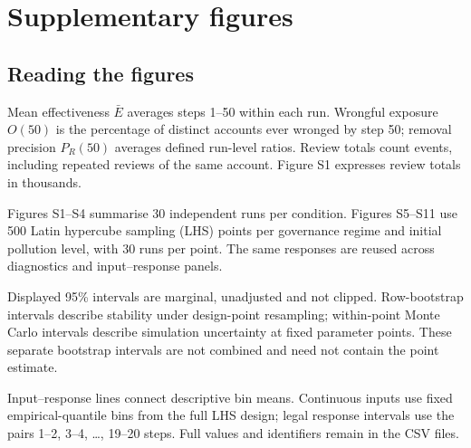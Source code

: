 \documentclass[10pt]{article}
\newif\ifABMLandscapePage
\begin{document}
\clearpage
{}
\ABMLandscapePagetrue\pagestyle{empty}
\begin{landscape}

\end{landscape}
\ABMLandscapePagefalse\pagestyle{plain}
\restoregeometry
\clearpage

\section{Supplementary figures}\label{sec:supp-figures}
\subsection*{Reading the figures}

Mean effectiveness $\bar E$ averages steps 1--50 within each run. Wrongful exposure $O(50)$ is the percentage of distinct accounts ever wronged by step 50; removal precision $P_R(50)$ averages defined run-level ratios. Review totals count events, including repeated reviews of the same account. Figure S1 expresses review totals in thousands.

Figures S1--S4 summarise 30 independent runs per condition. Figures S5--S11 use 500 Latin hypercube sampling (LHS) points per governance regime and initial pollution level, with 30 runs per point. The same responses are reused across diagnostics and input--response panels.

Displayed 95\% intervals are marginal, unadjusted and not clipped. Row-bootstrap intervals describe stability under design-point resampling; within-point Monte Carlo intervals describe simulation uncertainty at fixed parameter points. These separate bootstrap intervals are not combined and need not contain the point estimate.

Input--response lines connect descriptive bin means. Continuous inputs use fixed empirical-quantile bins from the full LHS design; legal response intervals use the pairs 1--2, 3--4, \ldots, 19--20 steps. Full values and identifiers remain in the CSV files.

\clearpage

\end{document}
